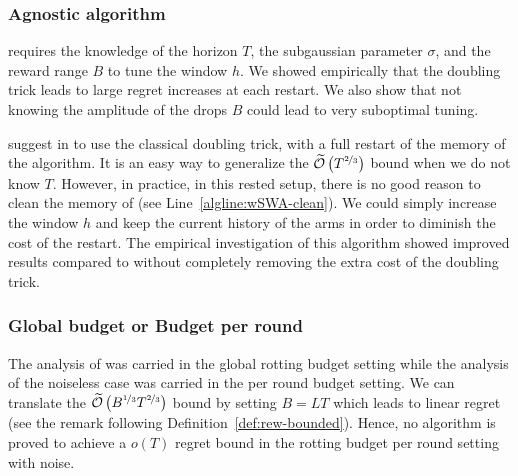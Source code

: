 \subsubsection{Agnostic algorithm}
\SWA requires the knowledge of the horizon $T$, the subgaussian parameter $\sigma$, and the reward range $B$  to tune the window $h$. We showed empirically that the doubling trick leads to large regret increases at each restart. We also show that not knowing the amplitude of the drops $B$ could lead to very suboptimal tuning.

\begin{remark}
\citet{levine2017rotting} suggest in \wSWA to use the classical doubling trick, with a full restart of the memory of the algorithm. It is an easy way to generalize the $\widetilde{\mathcal{O}}\left(T^{\nicefrac{2}{3}}\right)$ bound when we do not know $T$. However, in practice, in this rested setup, there is no good reason to clean the memory of \wSWA (see Line~\ref{algline:wSWA-clean}). We could simply increase the window $h$ and keep the current history of the arms in order to diminish the cost of the restart. The empirical investigation of this algorithm showed improved results compared to \wSWA without completely removing the extra cost of the doubling trick.
\end{remark}


\subsubsection{Global budget or Budget per round}

The analysis of \SWA was carried in the global rotting budget setting while the analysis of the noiseless case was carried in the per round budget setting. We can translate the $\widetilde{\mathcal{O}}\left(B^{\nicefrac{1}{3}}T^{\nicefrac{2}{3}}\right)$ bound by setting $B= LT$ which leads to linear regret (see the remark following Definition~\ref{def:rew-bounded}). Hence, no algorithm is proved to achieve a $o(T)$ regret bound in the rotting budget per round setting with noise.

